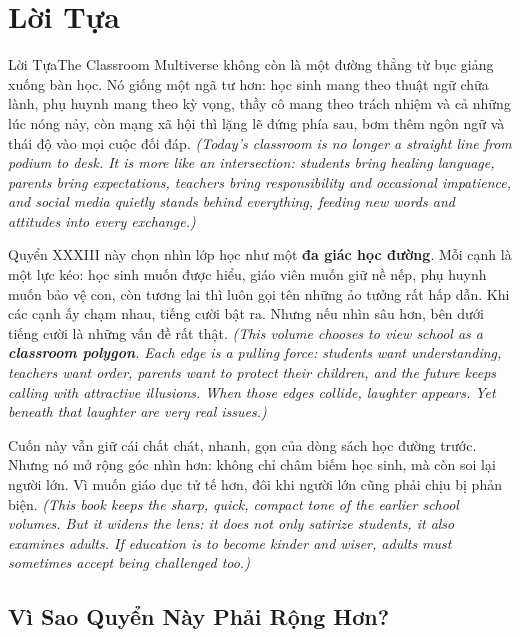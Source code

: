 \chapter*{Lời Tựa}

\begin{truyen}{Lời Tựa}{The Classroom Multiverse}
 không còn là một đường thẳng từ bục giảng xuống bàn học. Nó giống một ngã tư hơn: học sinh mang theo thuật ngữ chữa lành, phụ huynh mang theo kỳ vọng, thầy cô mang theo trách nhiệm và cả những lúc nóng nảy, còn mạng xã hội thì lặng lẽ đứng phía sau, bơm thêm ngôn ngữ và thái độ vào mọi cuộc đối đáp.
\textit{(Today's classroom is no longer a straight line from podium to desk. It is more like an intersection: students bring healing language, parents bring expectations, teachers bring responsibility and occasional impatience, and social media quietly stands behind everything, feeding new words and attitudes into every exchange.)}

Quyển XXXIII này chọn nhìn lớp học như một \textbf{đa giác học đường}. Mỗi cạnh là một lực kéo: học sinh muốn được hiểu, giáo viên muốn giữ nề nếp, phụ huynh muốn bảo vệ con, còn tương lai thì luôn gọi tên những ảo tưởng rất hấp dẫn. Khi các cạnh ấy chạm nhau, tiếng cười bật ra. Nhưng nếu nhìn sâu hơn, bên dưới tiếng cười là những vấn đề rất thật.
\textit{(This volume chooses to view school as a \textbf{classroom polygon}. Each edge is a pulling force: students want understanding, teachers want order, parents want to protect their children, and the future keeps calling with attractive illusions. When those edges collide, laughter appears. Yet beneath that laughter are very real issues.)}

Cuốn này vẫn giữ cái chất chát, nhanh, gọn của dòng sách học đường trước. Nhưng nó mở rộng góc nhìn hơn: không chỉ châm biếm học sinh, mà còn soi lại người lớn. Vì muốn giáo dục tử tế hơn, đôi khi người lớn cũng phải chịu bị phản biện.
\textit{(This book keeps the sharp, quick, compact tone of the earlier school volumes. But it widens the lens: it does not only satirize students, it also examines adults. If education is to become kinder and wiser, adults must sometimes accept being challenged too.)}
\end{truyen}

\section*{Vì Sao Quyển Này Phải Rộng Hơn?}

